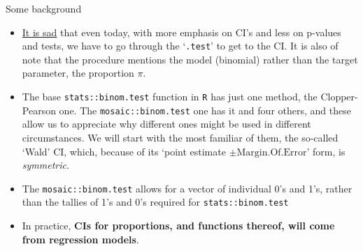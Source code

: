 \documentclass[10pt,handout]{beamer}\usepackage[]{graphicx}\usepackage[]{color}
\begin{document}
\begin{frame}{Some background}
	\small
	
	\begin{itemize}
		\item \underline{It is sad} that even today, with more emphasis on CI's and less on p-values and tests, we have to go through the `\texttt{.test}' to get to the CI. It is also of note that the procedure mentions the model (binomial) rather than the target parameter, the proportion $\pi.$ 
		
		\item The base \texttt{stats::binom.test} function in \texttt{R} has just one method, the Clopper-Pearson one. The \texttt{mosaic::binom.test} one has it and four others, and these allow us to appreciate why different ones might be used in different circumstances. We will start with the most familiar of them, the so-called `Wald' CI, which, because of its `point estimate $\pm \textrm{Margin.Of.Error}$' form, is \textit{symmetric}. 
		
		\item The \texttt{mosaic::binom.test} allows for a vector of individual 0's and 1's, rather than the tallies of 1's and 0's required for \texttt{stats::binom.test} 
		
		\pause
		
		\item In practice, \textbf{CIs for proportions, and functions thereof, will come from regression models}. 
		
	\end{itemize}
\end{frame}
\end{document}
